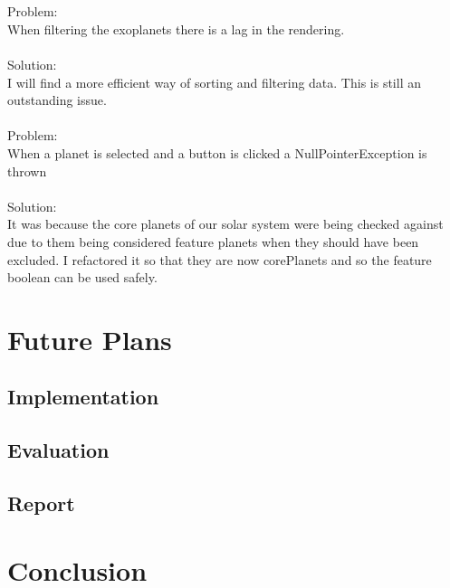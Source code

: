 \documentclass[11pt
              , a4paper
              , twoside
              , openright
              ]{report}
\begin{document}
\\\\
Problem:\\
When filtering the exoplanets there is a lag in the rendering. 
\\\\
Solution:\\
I will find a more efficient way of sorting and filtering data. This is still an outstanding issue.
\\\\
Problem:\\
When a planet is selected and a button is clicked a NullPointerException is thrown
\\\\
Solution:\\
It was because the core planets of our solar system were being checked against due to them being considered feature planets when they should have been excluded. I refactored it so that they are now corePlanets and so the feature boolean can be used safely.
\chapter{Future Plans}
\section{Implementation}
\section{Evaluation}
\section{Report}
\chapter{Conclusion}
\backmatter


%
\nocite{*}


\end{document}
